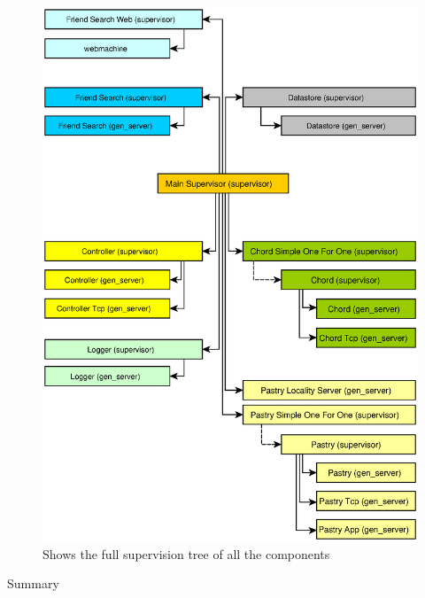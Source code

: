 \begin{figure}[!htb]
\begin{center}
	\includegraphics[width=0.9\linewidth]{illustrations/ClientSupervisionTree.eps}
\caption{Shows the full supervision tree of all the components}
\label{supervisionTree}
\end{center}
\end{figure}


Summary
